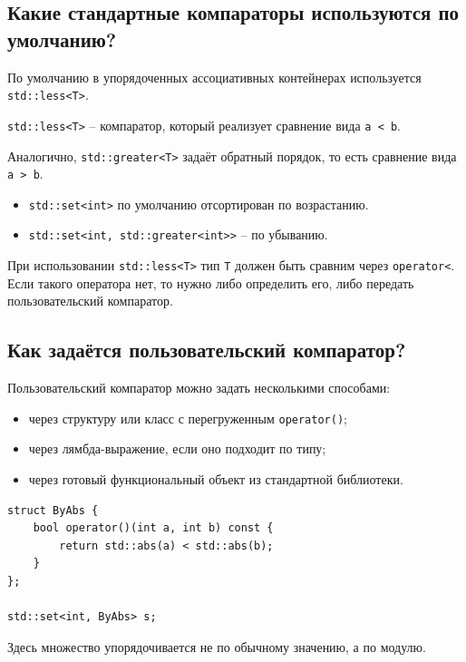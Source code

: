 \subsection{Какие стандартные компараторы используются по умолчанию?}
По умолчанию в упорядоченных ассоциативных контейнерах используется \texttt{std::less<T>}.

\begin{definition}
\texttt{std::less<T>} -- компаратор, который реализует сравнение вида \texttt{a < b}.
\end{definition}

Аналогично, \texttt{std::greater<T>} задаёт обратный порядок, то есть сравнение вида \texttt{a > b}.

\begin{itemize}
    \item \texttt{std::set<int>} по умолчанию отсортирован по возрастанию.
    \item \texttt{std::set<int, std::greater<int>>} -- по убыванию.
\end{itemize}

При использовании \texttt{std::less<T>} тип \texttt{T} должен быть сравним через \texttt{operator<}. Если такого оператора нет, то нужно либо определить его, либо передать пользовательский компаратор.

\subsection{Как задаётся пользовательский компаратор?}
Пользовательский компаратор можно задать несколькими способами:
\begin{itemize}
    \item через структуру или класс с перегруженным \texttt{operator()};
    \item через лямбда-выражение, если оно подходит по типу;
    \item через готовый функциональный объект из стандартной библиотеки.
\end{itemize}

\begin{example}
\begin{verbatim}
struct ByAbs {
    bool operator()(int a, int b) const {
        return std::abs(a) < std::abs(b);
    }
};

std::set<int, ByAbs> s;
\end{verbatim}
\end{example}

Здесь множество упорядочивается не по обычному значению, а по модулю.

